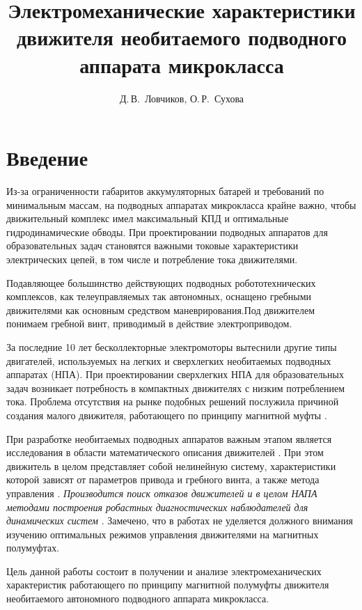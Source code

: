 \documentclass[12pt, twoside]{article}
\title [Характеристики движителя подводного аппарата]
{Электромеханические характеристики движителя необитаемого подводного аппарата микрокласса}
\author[Д.\,В.~Ловчиков, О.\,Р.~Сухова]  %
{Д.\,В.~Ловчиков, О.\,Р.~Сухова} %
[Д.\,В.~Ловчиков$^{1,2}$, О.\,Р.~Сухова$^2$] %
\begin{document}
\maketitle
\linenumbers

\section{Введение}
Из-за ограниченности габаритов аккумуляторных батарей и требований по минимальным массам, на подводных аппаратах микрокласса крайне важно, чтобы движительный комплекс имел максимальный КПД и оптимальные гидродинамические обводы. При проектировании подводных аппаратов для образовательных задач становятся важными токовые характеристики электрических цепей, в том числе и потребление тока движителями. 

Подавляющее большинство действующих подводных робототехнических комплексов, как телеуправляемых так автономных, оснащено гребными движителями как основным средством маневрирования.Под движителем понимаем гребной винт, приводимый в действие электроприводом.

За последние 10 лет бесколлекторные электромоторы вытеснили другие типы двигателей, используемых на легких и сверхлегких необитаемых подводных аппаратах (НПА). При проектировании сверхлегких НПА для образовательных задач возникает потребность в компактных движителях с низким потреблением тока. Проблема отсутствия на рынке подобных решений послужила причиной создания малого движителя, работающего по принципу магнитной муфты \cite{leonov2015}. 


При разработке необитаемых подводных аппаратов важным этапом является исследования в области математического описания движителей \cite{lewis1988}. При этом движитель в целом представляет собой  нелинейную систему, характеристики которой зависят от параметров привода и гребного винта, а также метода управления \cite{kostenko2019_1, kostenko2019_2, antonenko2018, siek2019}. \textit{Производится поиск отказов движителей и в целом НАПА методами построения робастных диагностических наблюдателей для динамических систем} \cite{lukoyanov2019, filaretov2019}. Замечено, что в работах не уделяется должного внимания изучению оптимальных режимов управления движителями на магнитных полумуфтах.

Цель данной работы состоит в получении и анализе электромеханических характеристик работающего по принципу магнитной полумуфты движителя необитаемого автономного подводного аппарата микрокласса.
\end{document}
